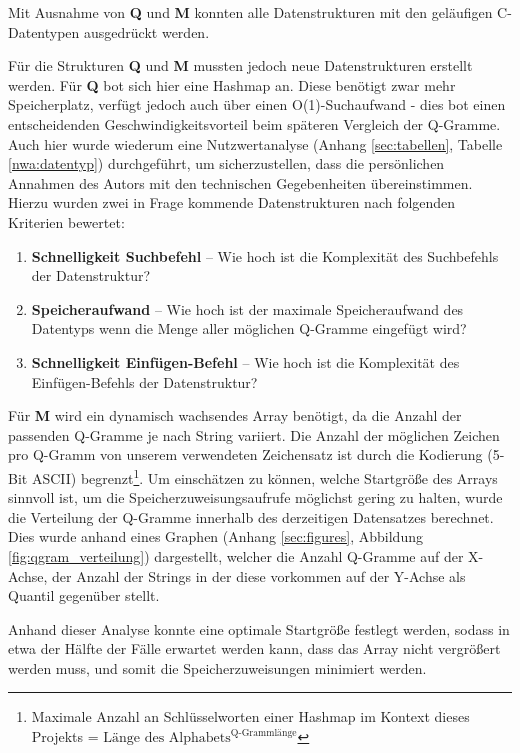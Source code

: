 Mit Ausnahme von \textbf{Q} und \textbf{M} konnten  alle Datenstrukturen mit den geläufigen C-Datentypen ausgedrückt werden.

Für die Strukturen \textbf{Q} und \textbf{M} mussten jedoch neue Datenstrukturen
erstellt werden. Für \textbf{Q} bot sich hier eine Hashmap an. Diese benötigt zwar
mehr Speicherplatz, verfügt jedoch auch über einen O(1)-Suchaufwand - dies bot einen entscheidenden Geschwindigkeitsvorteil beim späteren Vergleich der Q-Gramme.
Auch hier wurde wiederum eine Nutzwertanalyse (Anhang \ref{sec:tabellen}, Tabelle \ref{nwa:datentyp}) durchgeführt,
um sicherzustellen, dass die persönlichen Annahmen des Autors mit den technischen
Gegebenheiten übereinstimmen.
Hierzu wurden zwei in Frage kommende Datenstrukturen nach folgenden Kriterien bewertet:

\begin{enumerate}
	\item \textbf{Schnelligkeit Suchbefehl} -- Wie hoch ist die Komplexität des Suchbefehls der Datenstruktur?
    \item \textbf{Speicheraufwand} -- Wie hoch ist der maximale Speicheraufwand des Datentyps wenn die Menge aller möglichen Q-Gramme eingefügt wird?
    \item \textbf{Schnelligkeit Einfügen-Befehl} -- Wie hoch ist die Komplexität des Einfügen-Befehls der Datenstruktur?\\

\end{enumerate}

Für \textbf{M} wird ein dynamisch wachsendes Array benötigt, da die Anzahl der passenden
Q-Gramme je nach String variiert. Die Anzahl der möglichen Zeichen pro Q-Gramm
von unserem verwendeten Zeichensatz ist durch die Kodierung (5-Bit ASCII)
begrenzt\footnote{Maximale Anzahl an Schlüsselworten einer Hashmap im Kontext dieses Projekts = $\text{Länge des Alphabets}^\text{Q-Grammlänge}$ }.
Um einschätzen zu können, welche Startgröße des Arrays sinnvoll ist, um die
Speicherzuweisungsaufrufe möglichst gering zu halten, wurde die Verteilung der
Q-Gramme innerhalb des derzeitigen Datensatzes berechnet. Dies wurde anhand eines
Graphen (Anhang \ref{sec:figures}, Abbildung \ref{fig:qgram_verteilung}) dargestellt, welcher die Anzahl
Q-Gramme auf der X-Achse, der Anzahl der Strings in der diese vorkommen auf der Y-Achse als Quantil gegenüber stellt.

Anhand dieser Analyse konnte eine optimale Startgröße festlegt werden, sodass in etwa der Hälfte der Fälle
erwartet werden kann, dass das Array nicht vergrößert werden muss, und somit die
Speicherzuweisungen minimiert werden.


